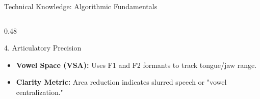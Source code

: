 \documentclass[aspectratio=169, 11pt]{beamer}
\begin{document}
\begin{frame}{Technical Knowledge: Algorithmic Fundamentals}
\begin{columns}[t]
\begin{column}{0.48\textwidth}
            \vspace{0.5em}

            \begin{block}{4. Articulatory Precision}
                \begin{itemize}
                    \item \textbf{Vowel Space (VSA):} Uses F1 and F2 formants to track tongue/jaw range.
                    \item \textbf{Clarity Metric:} Area reduction indicates slurred speech or "vowel centralization."
                \end{itemize}
            \end{block}
        \end{column}
    \end{columns}
\end{frame}
\end{document}
